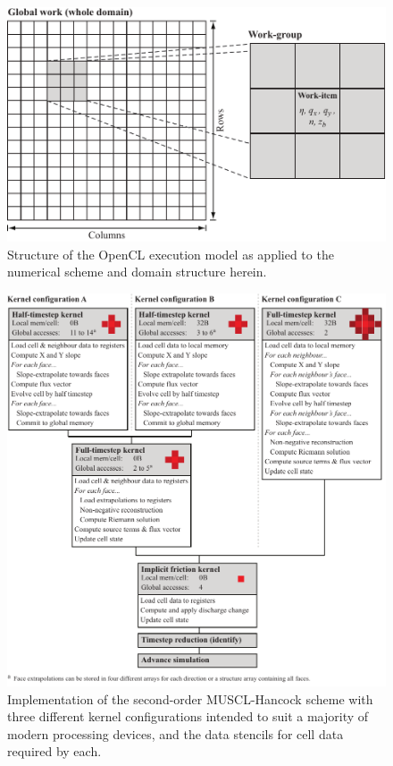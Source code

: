 \begin{figure}[tpb]
	\centering
	\includegraphics[width=1.0\textwidth]{heterogeneous-dev-figures/Figure_4_Greyscale.pdf}
	\caption{Structure of the OpenCL execution model as applied to the numerical scheme and domain structure herein.}
	\label{OpenCLExecStructure}
\end{figure}
\begin{figure}[tpb]
	\centering
	\includegraphics[width=1.0\textwidth]{heterogeneous-dev-figures/Figure_5_Colour.pdf}
	\caption{Implementation of the second-order MUSCL-Hancock scheme with three different kernel configurations intended to suit a majority of modern processing devices, and the data stencils for cell data required by each.}
	\label{Kernels}
\end{figure}

